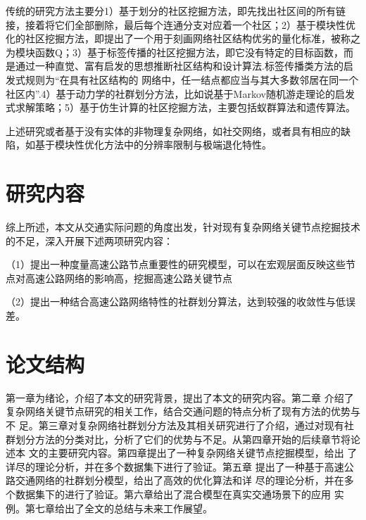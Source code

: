 			传统的研究方法主要分1）基于划分的社区挖掘方法，即先找出社区间的所有链接，接着将它们全部删除，最后每个连通分支对应着一个社区；2）基于模块性优化的社区挖掘方法，即提出了一个用于刻画网络社区结构优劣的量化标准，被称之为模块函数Q；3）基于标签传播的社区挖掘方法，即它没有特定的目标函数，而是通过一种直觉、富有启发的思想推断社区结构和设计算法.标签传播类方法的启发式规则为“在具有社区结构的 网络中，任一结点都应当与其大多数邻居在同一个 社区内”.4）基于动力学的社群划分方法，比如说基于Markov随机游走理论的启发式求解策略；5）基于仿生计算的社区挖掘方法，主要包括蚁群算法和遗传算法。

			上述研究或者基于没有实体的非物理复杂网络，如社交网络，或者具有相应的缺陷，如基于模块性优化方法中的分辨率限制与极端退化特性。

\section{研究内容}
    综上所述，本文从交通实际问题的角度出发，针对现有复杂网络关键节点挖掘技术的不足，深入开展下述两项研究内容：
    
		（1）提出一种度量高速公路节点重要性的研究模型，可以在宏观层面反映这些节点对高速公路网络的影响高，挖掘高速公路关键节点
		
		（2）提出一种结合高速公路网络特性的社群划分算法，达到较强的收敛性与低误差。
		
\section{论文结构}
    第一章为绪论，介绍了本文的研究背景，提出了本文的研究内容。第二章
介绍了复杂网络关键节点研究的相关工作，结合交通问题的特点分析了现有方法的优势与不
足。第三章对复杂网络社群划分方法及其相关研究进行了介绍，通过对现有社群划分方法的分类对比，分析了它们的优势与不足。从第四章开始的后续章节将论述本
文的主要研究内容。第四章提出了一种复杂网络关键节点挖掘模型，给出
了详尽的理论分析，并在多个数据集下进行了验证。第五章
提出了一种基于高速公路交通网络的社群划分模型，给出了高效的优化算法和详
尽的理论分析，并在多个数据集下的进行了验证。第六章给出了混合模型在真实交通场景下的应用
实例。第七章给出了全文的总结与未来工作展望。